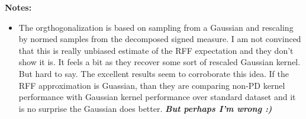 \begin{notebox}[colback=yellow!5]
\textbf{Notes:} 
\begin{itemize}[nosep]
\item The orgthogonalization is based on sampling from a Gaussian and rescaling by normed samples from the decomposed signed measure. I am not convinced that this is really unbiased estimate of the RFF expectation and they don't show it is. It feels a bit as they recover some sort of rescaled Gaussian kernel. But hard to say. The excellent results seem to corroborate this idea. If the RFF approximation is Guassian, than they are comparing non-PD kernel performance with Gaussian kernel performance over standard dataset and it is no surprise the Gaussian does better. \emph{\textbf{But perhaps I'm wrong :)}}
\end{itemize}
\end{notebox}

